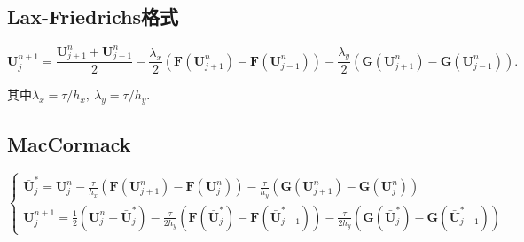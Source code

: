 \documentclass[12pt]{article}
\begin{document}
\subsection{Lax-Friedrichs格式}

\begin{equation}
	\bm{U}_{j}^{n+1}=\frac{\bm{U}_{j+1}^{n}+\bm{U}_{j-1}^{n}}{2}-\frac{\lambda_x}{2}\left(\bm{F}\left(\bm{U}_{j+1}^{n}\right)-\bm{F}\left(\bm{U}_{j-1}^{n}\right)\right)-\frac{\lambda_y}{2}\left(\bm{G}\left(\bm{U}_{j+1}^{n}\right)-\bm{G}\left(\bm{U}_{j-1}^{n}\right)\right).
\end{equation}

其中$\lambda_x = \tau/h_x,\ \lambda_y = \tau/h_y$.








\subsection{MacCormack}

\begin{equation}
	\left\{\begin{array}{l}
	\bar{\bm{U}}_{j}^{*}=\bm{U}_{j}^{n}-\frac{\tau}{h_x}\left(\bm{F}\left(\bm{U}_{j+1}^{n}\right)-\bm{F}\left(\bm{U}_{j}^{n}\right)\right)-\frac{\tau}{h_y}\left(\bm{G}\left(\bm{U}_{j+1}^{n}\right)-\bm{G}\left(\bm{U}_{j}^{n}\right)\right) \\
	\bm{U}_{j}^{n+1}=\frac{1}{2}\left(\bm{U}_{j}^{n}+\bar{\bm{U}}_{j}^{*}\right)-\frac{\tau}{2 h_y}\left(\bm{F}\left(\bar{\bm{U}}_{j}^{*}\right)-\bm{F}\left(\bar{\bm{U}}_{j-1}^{*}\right)\right)-\frac{\tau}{2 h_y}\left(\bm{G}\left(\bar{\bm{U}}_{j}^{*}\right)-\bm{G}\left(\bar{\bm{U}}_{j-1}^{*}\right)\right)
	\end{array}\right.
\end{equation}
\end{document}
